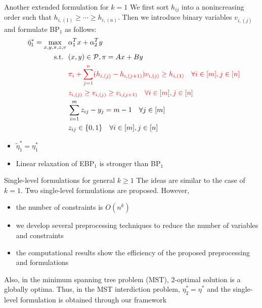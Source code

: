 \documentclass{beamer}
\begin{document}
\begin{frame}{Another extended formulation for $k=1$}\small
	We first sort $h_{ij}$ into a nonincreasing order such that $h_{i, (1)} \geq \cdots \geq h_{i,(n)}$. Then we introduce binary variables $v_{i,(j)}$ and formulate BP$_1$ as follows:
	\begin{align*}
	[\text{EBP}_1]~~\tilde{\eta}_1^* = \max_{x, y, \pi, z, v}\; & \alpha_1^Tx + \alpha_2^Ty \nonumber \\
	\text{s.t.~~} &  (x, y)\in \mathcal{P}, \pi = Ax + By \\
	& \color{red} \pi_i + \sum_{j=1}^n(h_{i,(j)} - h_{i, (j+1)})v_{i,(j)} \geq h_{i,(1)} \quad \forall i \in [m], j\in [n]  \\
	& \color{red} z_{i, (j)} \geq v_{i, (j)} \geq v_{i, (j+1)} \quad \forall i\in [m], j\in [n] \\
	& \sum_{i=1}^m z_{ij} - y_j = m - 1  \quad \forall j\in [m]  \\
	& z_{ij} \in \{0,1\} \quad \forall i \in [m], j\in [n] 
	\end{align*}
	\vspace{-0.3cm}
	\begin{itemize}
		\item $\tilde{\eta}_1^* = \eta_1^*$
		\item Linear relaxation of EBP$_1$ is stronger than BP$_1$
	\end{itemize}
\end{frame}

\begin{frame}{Single-level formulations for general $k\geq 1$} \small
	The ideas are similar to the case of $k=1$. Two single-level formulations are proposed. However,
	\begin{itemize}
		\item the number of constraints is $O(n^k)$
		\item we develop several preprocessing techniques to reduce the number of variables and constraints
		\item the computational results show the efficiency of the proposed preprocessing and formulations
	\end{itemize} \pause

	Also, in the minimum spanning tree problem (MST), $2$-optimal solution is a globally optima. Thus, in the MST interdiction problem, $\eta_2^* = \eta^*$ and the single-level formulation is obtained through our framework
	
\end{frame}
\end{document}
